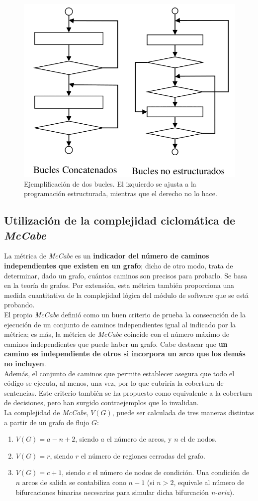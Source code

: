 \begin{figure}[H]
    \centering
    \includegraphics[width=0.5\linewidth]{Resources/Tema6/Ejemplo_BucleNoEstructurado.png}
    \caption{Ejemplificación de dos bucles. El izquierdo se ajusta a la programación estructurada, mientras que el derecho no lo hace.}
\end{figure}

\subsection{Utilización de la complejidad ciclomática de \textit{McCabe}}

La métrica de \textit{McCabe} es un \textbf{indicador del número de caminos independientes que existen en un grafo}; dicho de otro modo, trata de determinar, dado un grafo, cuántos caminos son precisos para probarlo. Se basa en la teoría de grafos. Por extensión, esta métrica también proporciona una medida cuantitativa de la complejidad lógica del módulo de software que se está probando.\\

El propio \textit{McCabe} definió como un buen criterio de prueba la consecución de la ejecución de un conjunto de caminos independientes igual al indicado por la métrica; es más, la métrica de \textit{McCabe} coincide con el número máximo de caminos independientes que puede haber un grafo. Cabe destacar que \textbf{un camino es independiente de otros si incorpora un arco que los demás no incluyen}.\\

Además, el conjunto de caminos que permite establecer asegura que todo el código se ejecuta, al menos, una vez, por lo que cubriría la cobertura de sentencias. Este criterio también se ha propuesto como equivalente a la cobertura de decisiones, pero han surgido contraejemplos que lo invalidan.\\

La complejidad de \textit{McCabe}, $V (G)$, puede ser calculada de tres maneras distintas a partir de un grafo de flujo $G$:
\begin{enumerate}
    \item $V (G) = a-n+2$, siendo $a$ el número de arcos, y $n$ el de nodos.
    \item $V (G) = r$, siendo $r$ el número de regiones cerradas del grafo.
    \item $V (G) = c+1$, siendo $c$ el número de nodos de condición. Una condición de $n$ arcos de salida se contabiliza cono $n-1$ (si $n>2$, equivale al número de bifurcaciones binarias necesarias para simular dicha bifurcación \textit{n-aria}).
\end{enumerate}

